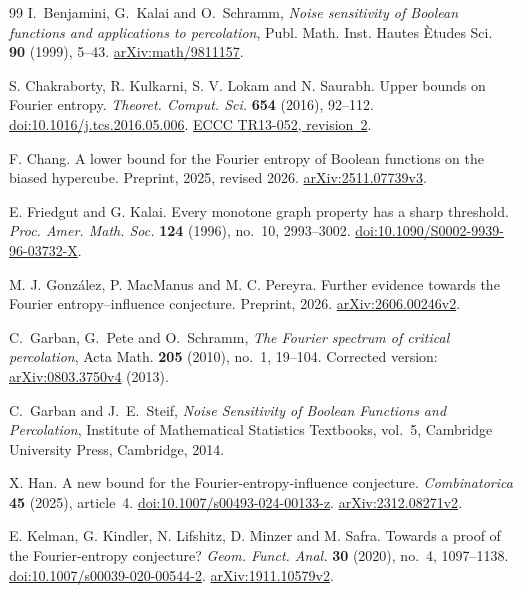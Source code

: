 \documentclass[11pt]{amsart}
\theoremstyle{remark}
\begin{document}
\begin{thebibliography}{99}
I.~Benjamini, G.~Kalai and O.~Schramm,
\emph{Noise sensitivity of Boolean functions and applications to percolation},
Publ. Math. Inst. Hautes \`Etudes Sci. \textbf{90} (1999), 5--43.
\href{https://arxiv.org/abs/math/9811157}{arXiv:math/9811157}.

S. Chakraborty, R. Kulkarni, S. V. Lokam and N. Saurabh.
Upper bounds on Fourier entropy.
\emph{Theoret. Comput. Sci.} \textbf{654} (2016), 92--112.
\href{https://doi.org/10.1016/j.tcs.2016.05.006}{doi:10.1016/j.tcs.2016.05.006}.
\href{https://eccc.weizmann.ac.il/report/2013/052/revision/2/}{ECCC TR13-052, revision~2}.

F. Chang.
A lower bound for the Fourier entropy of Boolean functions on the biased hypercube.
Preprint, 2025, revised 2026.
\href{https://arxiv.org/abs/2511.07739v3}{arXiv:2511.07739v3}.

E. Friedgut and G. Kalai.
Every monotone graph property has a sharp threshold.
\emph{Proc. Amer. Math. Soc.} \textbf{124} (1996), no.~10, 2993--3002.
\href{https://doi.org/10.1090/S0002-9939-96-03732-X}{doi:10.1090/S0002-9939-96-03732-X}.

M. J. Gonz\'alez, P. MacManus and M. C. Pereyra.
Further evidence towards the Fourier entropy--influence conjecture.
Preprint, 2026.
\href{https://arxiv.org/abs/2606.00246v2}{arXiv:2606.00246v2}.

C.~Garban, G.~Pete and O.~Schramm,
\emph{The Fourier spectrum of critical percolation},
Acta Math. \textbf{205} (2010), no.~1, 19--104.
Corrected version: \href{https://arxiv.org/abs/0803.3750}{arXiv:0803.3750v4} (2013).

C.~Garban and J.~E.~Steif,
\emph{Noise Sensitivity of Boolean Functions and Percolation},
Institute of Mathematical Statistics Textbooks, vol.~5,
Cambridge University Press, Cambridge, 2014.

X. Han.
A new bound for the Fourier-entropy-influence conjecture.
\emph{Combinatorica} \textbf{45} (2025), article~4.
\href{https://doi.org/10.1007/s00493-024-00133-z}{doi:10.1007/s00493-024-00133-z}.
\href{https://arxiv.org/abs/2312.08271v2}{arXiv:2312.08271v2}.

E. Kelman, G. Kindler, N. Lifshitz, D. Minzer and M. Safra.
Towards a proof of the Fourier-entropy conjecture?
\emph{Geom. Funct. Anal.} \textbf{30} (2020), no.~4, 1097--1138.
\href{https://doi.org/10.1007/s00039-020-00544-2}{doi:10.1007/s00039-020-00544-2}.
\href{https://arxiv.org/abs/1911.10579v2}{arXiv:1911.10579v2}.


\end{thebibliography}
\end{document}
